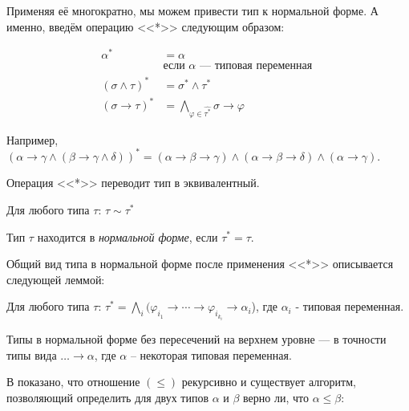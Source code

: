 \documentclass[../main.tex]{subfiles}
\begin{document}
Применяя её многократно, мы можем привести тип к нормальной форме. А именно, введём операцию <<*>> следующим образом: 

\begin{definition}
\begin{align*}
\alpha^* &= \alpha \\
    &\text{если $\alpha$ --- типовая переменная }\\
(\sigma \wedge \tau)^* &= \sigma^* \wedge \tau^*\\
(\sigma \to \tau)^* &= \bigwedge \limits_{\varphi \in \hat{\tau^*}} \sigma \to \varphi
\end{align*}
\end{definition}

Например, $(\alpha \to \gamma \wedge (\beta \to \gamma \wedge \delta))^* = (\alpha \to \beta \to \gamma) \wedge (\alpha \to \beta \to \delta) \wedge (\alpha \to \gamma)$.

Операция <<*>> переводит тип в эквивалентный.

\begin{lemma} \label{normal form}
Для любого типа $\tau$: $\tau \sim \tau^*$
\end{lemma}


\begin{definition}
Тип $\tau$ находится в {\it нормальной форме}, если $\tau^* = \tau$.
\end{definition}

Общий вид типа в нормальной форме после применения <<*>> описывается следующей леммой:

\begin{lemma}
Для любого типа $\tau$: $\tau^* = \bigwedge \limits_i (\varphi_i_1 \to \cdots \to \varphi_i_{k_i} \to \alpha_i$), где $\alpha_i$ - типовая переменная.
\end{lemma}

\begin{corollary} \label{normal form unit}
Типы в нормальной форме без пересечений на верхнем уровне --- в точности типы вида $\dots \to \alpha$, где $\alpha$ -- некоторая типовая переменная.
\end{corollary}

В \cite{hindley_1982} показано, что отношение $(\leqslant)$ рекурсивно и существует алгоритм, позволяющий определить для двух типов $\alpha$ и $\beta$ верно ли, что $\alpha \leqslant \beta$:
\end{document}
